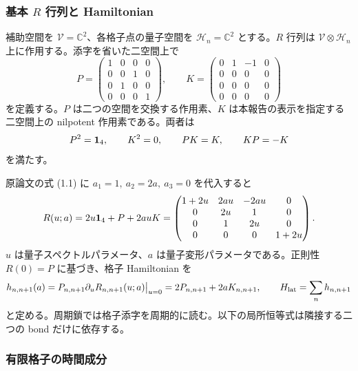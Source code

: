 \subsubsection{基本 $R$ 行列と Hamiltonian}

補助空間を $\mathcal V=\mathbb C^2$、各格子点の量子空間を $\mathcal H_n=\mathbb C^2$ とする。$R$ 行列は $\mathcal V\otimes\mathcal H_n$ 上に作用する。添字を省いた二空間上で
\begin{equation}
P=\begin{pmatrix}1&0&0&0\\0&0&1&0\\0&1&0&0\\0&0&0&1\end{pmatrix},
\qquad
K=\begin{pmatrix}0&1&-1&0\\0&0&0&0\\0&0&0&0\\0&0&0&0\end{pmatrix}
\label{audit5q:eq:PK}
\end{equation}
を定義する。$P$ は二つの空間を交換する作用素、$K$ は本報告の表示を指定する二空間上の nilpotent 作用素である。両者は
\begin{equation}
P^2=\mathbf 1_4,\qquad K^2=0,\qquad PK=K,\qquad KP=-K
\label{audit5q:eq:PKalgebra}
\end{equation}
を満たす。

原論文の式 (1.1) に $a_1=1,\ a_2=2a,\ a_3=0$ を代入すると\cite{DFN}
\begin{equation}
R(u;a)=2u\mathbf 1_4+P+2auK
=\begin{pmatrix}
1+2u&2au&-2au&0\\
0&2u&1&0\\
0&1&2u&0\\
0&0&0&1+2u
\end{pmatrix}.
\label{audit5q:eq:R}
\end{equation}
$u$ は量子スペクトルパラメータ、$a$ は量子変形パラメータである。正則性 $R(0)=P$ に基づき、格子 Hamiltonian を
\begin{equation}
h_{n,n+1}(a)=P_{n,n+1}\partial_uR_{n,n+1}(u;a)\big|_{u=0}
=2P_{n,n+1}+2aK_{n,n+1},\qquad
H_{\rm lat}=\sum_n h_{n,n+1}
\label{audit5q:eq:h}
\end{equation}
と定める。周期鎖では格子添字を周期的に読む。以下の局所恒等式は隣接する二つの bond だけに依存する。

\subsubsection{有限格子の時間成分}

